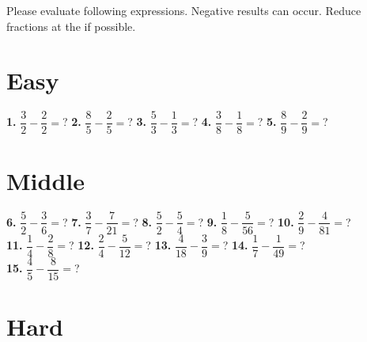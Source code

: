 \documentclass[a4paper]{article}
\begin{document}
\begin{Large}

Please evaluate following expressions. Negative results can occur. Reduce fractions at the if possible.

\section* {Easy}
		
\textbf{1.} $\dfrac{3}{2} - \dfrac{2}{2} =$? \hspace{0.2cm}
\textbf{2.} $\dfrac{8}{5} - \dfrac{2}{5} =$? \hspace{0.2cm}
\textbf{3.} $\dfrac{5}{3} - \dfrac{1}{3} =$? \hspace{0.2cm}
\textbf{4.} $\dfrac{3}{8} - \dfrac{1}{8} =$? \hspace{0.2cm}
\textbf{5.} $\dfrac{8}{9} - \dfrac{2}{9} =$?

		
\section* {Middle}
		
\textbf{6.} $\dfrac{5}{2} - \dfrac{3}{6} =$? \hspace{0.2cm}
\textbf{7.} $\dfrac{3}{7} - \dfrac{7}{21} =$? \hspace{0.2cm}
\textbf{8.} $\dfrac{5}{2} - \dfrac{5}{4} =$? \hspace{0.2cm}
\textbf{9.} $\dfrac{1}{8} - \dfrac{5}{56} =$? \hspace{0.2cm}
\textbf{10.} $\dfrac{2}{9} - \dfrac{4}{81} =$? \\[1cm]
\textbf{11.} $\dfrac{1}{4} - \dfrac{2}{8}=$? \hspace{0.2cm}
\textbf{12.} $\dfrac{2}{4} - \dfrac{5}{12} =$? \hspace{0.2cm}
\textbf{13.} $\dfrac{4}{18} - \dfrac{3}{9} =$? \hspace{0.2cm}
\textbf{14.} $\dfrac{1}{7} - \dfrac{1}{49} =$? \hspace{0.2cm} \\[1cm]
\textbf{15.} $\dfrac{4}{5} - \dfrac{8}{15} =$?
		
\section* {Hard}


\end{Large}
\end{document}
